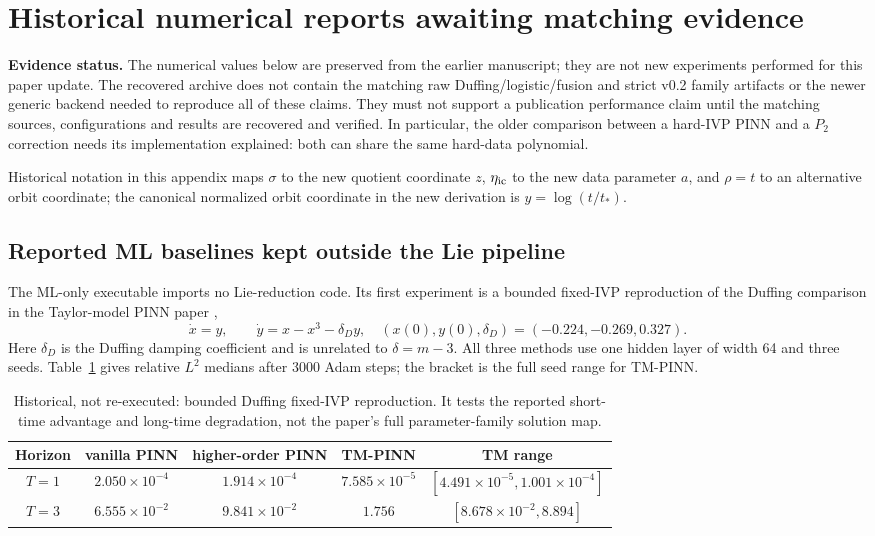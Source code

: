 \clearpage
\appendix
\section{Historical numerical reports awaiting matching evidence}
\label{app:historical}
\textbf{Evidence status.} The numerical values below are preserved from the
earlier manuscript; they are not new experiments performed for this paper
update. The recovered archive does not contain the matching raw
Duffing/logistic/fusion and strict v0.2 family artifacts or the newer generic
backend needed to reproduce all of these claims. They must not support a
publication performance claim until the matching sources, configurations
and results are recovered and verified. In particular, the older comparison
between a hard-IVP PINN and a $P_2$ correction needs its implementation
explained: both can share the same hard-data polynomial.

Historical notation in this appendix maps $\sigma$ to the new quotient
coordinate $z$, $\eta_{\rm ic}$ to the new data parameter $a$, and $\rho=t$
to an alternative orbit coordinate; the canonical normalized orbit
coordinate in the new derivation is $y=\log(t/t_*)$.

\subsection{Reported ML baselines kept outside the Lie pipeline}
The ML-only executable imports no Lie-reduction code.  Its first experiment is
a bounded fixed-IVP reproduction of the Duffing comparison in the Taylor-model
PINN paper \cite{tmpinn},
\[
 \dot x=y,\qquad \dot y=x-x^3-\delta_Dy,
 \quad (x(0),y(0),\delta_D)=(-0.224,-0.269,0.327).
\]
Here $\delta_D$ is the Duffing damping coefficient and is unrelated to
$\delta=m-3$. All three methods use one hidden layer of width 64 and three
seeds. Table~\ref{tab:duffing} gives relative $L^2$ medians after 3000 Adam
steps; the bracket is the full seed range for TM-PINN.
\begin{table}[htbp]
\centering\small
\begin{tabular}{@{}ccccc@{}}
\toprule
Horizon & vanilla PINN & higher-order PINN & TM-PINN & TM range \\
\midrule
$T=1$ & $2.050\times10^{-4}$ & $1.914\times10^{-4}$ & $7.585\times10^{-5}$
 & $[4.491\times10^{-5},1.001\times10^{-4}]$ \\
$T=3$ & $6.555\times10^{-2}$ & $9.841\times10^{-2}$ & $1.756$
 & $[8.678\times10^{-2},8.894]$ \\
\bottomrule
\end{tabular}
\caption{Historical, not re-executed: bounded Duffing fixed-IVP reproduction. It tests the reported
short-time advantage and long-time degradation, not the paper's full
parameter-family solution map.}
\label{tab:duffing}
\end{table}


